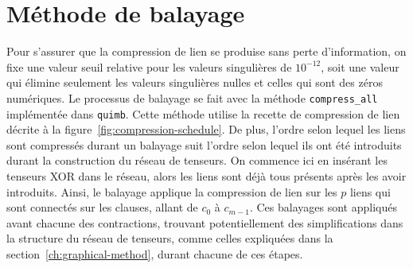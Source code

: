 \section{Méthode de balayage} \label{sec:sweeping-method}
Pour s'assurer que la compression de lien se produise sans perte d'information, on fixe une valeur seuil relative pour les valeurs singulières de $10^{-12}$, soit une valeur qui élimine seulement les valeurs singulières nulles et celles qui sont des zéros numériques.
Le processus de balayage se fait avec la méthode \verb|compress_all| implémentée dans \verb|quimb|.
Cette méthode utilise la recette de compression de lien décrite à la figure~\ref{fig:compression-schedule}.
De plus, l'ordre selon lequel les liens sont compressés durant un balayage suit l'ordre selon lequel ils ont été introduits durant la construction du réseau de tenseurs.
On commence ici en insérant les tenseurs XOR dans le réseau, alors les liens sont déjà tous présents après les avoir introduits.
Ainsi, le balayage applique la compression de lien sur les $p$ liens qui sont connectés sur les clauses, allant de $c_0$ à $c_{m-1}$.
Ces balayages sont appliqués avant chacune des contractions, trouvant potentiellement des simplifications dans la structure du réseau de tenseurs, comme celles expliquées dans la section~\ref{ch:graphical-method}, durant chacune de ces étapes.

